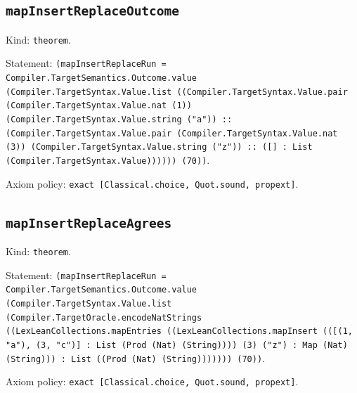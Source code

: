 \documentclass[11pt]{article}
\begin{document}
\subsection*{\texttt{mapInsertReplaceOutcome}}
\noindent Kind: \texttt{theorem}.\par
\noindent Statement: \texttt{(mapInsertReplaceRun = Compiler.TargetSemantics.Outcome.value (Compiler.TargetSyntax.Value.list ((Compiler.TargetSyntax.Value.pair (Compiler.TargetSyntax.Value.nat (1)) (Compiler.TargetSyntax.Value.string ("a")) :: (Compiler.TargetSyntax.Value.pair (Compiler.TargetSyntax.Value.nat (3)) (Compiler.TargetSyntax.Value.string ("z")) :: ([] : List (Compiler.TargetSyntax.Value)))))) (70))}.\par
\noindent Axiom policy: \texttt{exact [Classical.choice, Quot.sound, propext]}.\par
\subsection*{\texttt{mapInsertReplaceAgrees}}
\noindent Kind: \texttt{theorem}.\par
\noindent Statement: \texttt{(mapInsertReplaceRun = Compiler.TargetSemantics.Outcome.value (Compiler.TargetSyntax.Value.list (Compiler.TargetOracle.encodeNatStrings ((LexLeanCollections.mapEntries ((LexLeanCollections.mapInsert (([(1, "a"), (3, "c")] : List (Prod (Nat) (String)))) (3) ("z") : Map (Nat) (String))) : List ((Prod (Nat) (String))))))) (70))}.\par
\noindent Axiom policy: \texttt{exact [Classical.choice, Quot.sound, propext]}.\par
\end{document}
